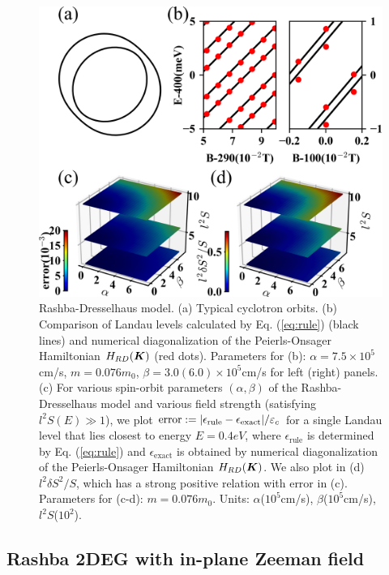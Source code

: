 \documentclass[aps, prb, showpacs, twocolumn, notitlepage, superscriptaddress]{revtex4-1}
\begin{document}
\begin{figure}
\includegraphics[width=1.0\columnwidth]{RD.png}
\caption{Rashba-Dresselhaus model. (a) Typical cyclotron orbits. (b) Comparison of Landau levels calculated by Eq. (\ref{eq:rule}) (black lines) and numerical diagonalization of the Peierls-Onsager Hamiltonian  $H_{RD}(\boldsymbol{K})$ (red dots). Parameters for (b): $\alpha=7.5\times10^{5}$cm/s, $m=0.076m_0$, $\beta=3.0(6.0)\times 10^{5}$cm/s for left (right) panels. (c) For various spin-orbit parameters $(\alpha,\beta)$ of the Rashba-Dresselhaus model and various field strength (satisfying $l^2S(E)\gg 1$), we plot  $\text{error}:=|\epsilon_\text{rule}-\epsilon_\text{exact}|/\varepsilon_c$ for a single Landau level that lies closest to energy $E=0.4eV$, where $\epsilon_\text{rule}$ is determined by Eq. (\ref{eq:rule}) and $\epsilon_{\text{exact}}$ is obtained by numerical diagonalization of the Peierls-Onsager Hamiltonian  $H_{RD}(\boldsymbol{K})$. We also plot in (d) $l^2\delta S^2/S$, which has a strong positive relation with error in (c). Parameters for (c-d): $m=0.076m_0$. Units: $\alpha$($10^{5}$cm/s), $\beta$($10^{5}$cm/s), $l^2 S$($10^2$).\label{fig:RD}}
\end{figure}

\subsection{Rashba 2DEG with in-plane Zeeman field}\label{sec:inplanezeeman}
\end{document}
